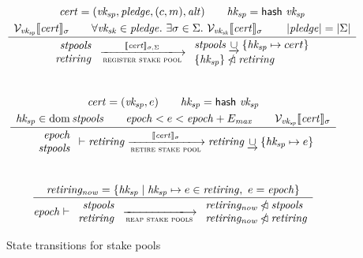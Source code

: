 \documentclass[11pt,a4paper]{article}
\DeclareMathOperator{\dom}{dom}
\begin{document}
\begin{figure}

\begin{equation*}
\frac{
  \begin{array}{c}
    \var{cert} = (\var{vk_{sp}}, \var{pledge}, (c, m), \var{alt}) \qquad
    \var{hk_{sp}} = \fun{hash} ~ \var{vk_{sp}}
    \\[0.3em]
    \verified{\var{vk_{sp}}}{\var{cert}}{\sigma} \qquad 
    \forall \var{vk_{sk}} \in \var{pledge}. ~ \exists \sigma \in \Sigma. ~
      \verified{\var{vk_{sk}}}{\var{cert}}{\sigma}  \qquad
    \size{\var{pledge}} = \size{\Sigma}
  \end{array}
}{
  \begin{array}{r}
    \var{stpools} \\
    \var{retiring}
  \end{array}
  \transitionarrow{register stake pool}
                  {\signed{\var{cert}}{\sigma,\Sigma}}
  \begin{array}{l}
    \var{stpools} \unionoverride \{\var{hk_{sp}} \mapsto cert\} \\
    \{\var{hk_{sp}}\} \subtractdom \var{retiring}
  \end{array}
}
\end{equation*}
%
\\[1em]
%
\begin{equation*}
\frac{
  \begin{array}{c}
    \var{cert} = (\var{vk_{sp}}, e) \qquad
    \var{hk_{sp}} = \fun{hash} ~ \var{vk_{sp}}
    \\[0.3em]
    \var{hk_{sp}} \in \dom \var{stpools} \qquad
    \var{epoch} < e < \var{epoch} + E_\var{max} \qquad
    \verified{\var{vk_{sp}}}{\var{cert}}{\sigma}
  \end{array}
}{
  \begin{array}{r}
    \var{epoch} \\
    \var{stpools}
  \end{array}
  \vdash \var{retiring}
  \transitionarrow{retire stake pool}
                  {\signed{\var{cert}}{\sigma}}
  \var{retiring} \unionoverride \{ \var{hk_{sp}} \mapsto e \}
}
\end{equation*}
%
\\[1em]
%
\begin{equation*}
\frac{
  \var{retiring_{now}} = \{ \var{hk_{sp}} \mid
                            \var{hk_{sp}} \mapsto e \in \var{retiring}, ~
                            e = \var{epoch}
                         \}
}{
  \var{epoch} \vdash
  \begin{array}{r}
    \var{stpools} \\
    \var{retiring}
  \end{array}
  \transitionarrow{reap stake pools}{}
  \begin{array}{l}
    \var{retiring_{now}} \subtractdom \var{stpools} \\
    \var{retiring_{now}} \subtractdom \var{retiring}
  \end{array}
}
\end{equation*}

\caption{State transitions for stake pools}
\label{fig:delegation_transitions}
\end{figure}
\end{document}
